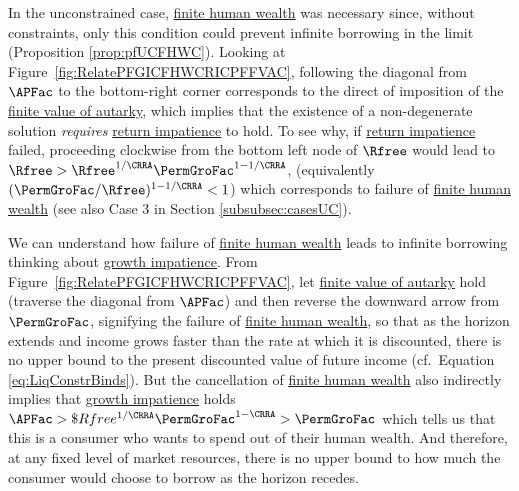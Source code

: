 \documentclass[BufferStockTheory]{subfiles}
\begin{document}
In the unconstrained case, \hyperlink{FHWC}{finite human wealth} was necessary since, without constraints, only  this condition could prevent infinite borrowing in the limit (Proposition \ref{prop:pfUCFHWC}). Looking at Figure~\ref{fig:RelatePFGICFHWCRICPFFVAC}, following the diagonal from $\APFac$ to the bottom-right corner corresponds to the direct of imposition of the \hyperlink{PFFVAC}{finite value of autarky}, which implies that the existence of a non-degenerate solution \textit{requires} \hyperlink{RIC}{return impatience} to hold. To see why, if \hyperlink{RIC}{return impatience} failed, proceeding clockwise from the bottom left node of $\Rfree$ would lead to $\Rfree> \Rfree^{1/\CRRA}\PermGroFac^{1-1/\CRRA}$, (equivalently $(\PermGroFac/\Rfree)^{1-{1/\CRRA}}<1$) which corresponds to failure of \hyperlink{FHWC}{finite human wealth} (see also Case 3 in Section \ref{subsubsec:casesUC}). 

We can understand how failure of \hyperlink{FHWC}{finite human wealth} leads to infinite borrowing thinking about \hyperlink{GICRaw}{growth impatience}. From Figure~\ref{fig:RelatePFGICFHWCRICPFFVAC}, let \hyperlink{PFFVAC}{finite value of autarky} hold (traverse the diagonal from $\APFac$)  and then reverse the downward arrow from $\PermGroFac$, signifying the failure of \hyperlink{FHWC}{finite human wealth}, so that as the horizon extends and income grows faster than the rate at which it is discounted, there is no upper bound to the present discounted value of future income (cf.\ Equation \eqref{eq:LiqConstrBinds}). But the cancellation of \hyperlink{FHWC}{finite human wealth} also indirectly implies that \hyperlink{GIDRaw}{growth impatience} holds $\APFac > \$Rfree^{1/\CRRA}\PermGroFac^{1-\CRRA} > \PermGroFac$ which tells us that this is a consumer who wants to spend out of their human wealth.  And therefore, at any fixed level of market resources, there is no upper bound to how much the consumer would choose to borrow as the horizon recedes. 

\begin{comment}
An argument similar to the discussion pertaining to Equation \eqref{eq:LiqConstrBinds}, \textit{any} arbitrarily low (negative) constraint on $\bNrm_{t}$ becomes relevant. Relaxing any constraint becomes always preferred and since income is guaranteed to grow faster than the rate of return, the consumer can continue to borrow without violating the no-ponzi condition (Equation \eqref{eq:NoDebtAtDeath}).
\end{comment}
\end{document}
